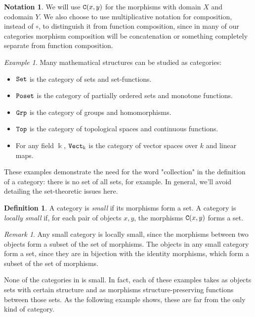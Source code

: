 \documentclass[11 pt]{amsart}
\theoremstyle{plain}   %
\theoremstyle{definition}
\newtheorem{defn}{Definition}[section]
\newtheorem{notn}{Notation}[section]
\theoremstyle{remark}
\newtheorem{rem}{Remark}[section]
\newtheorem{ex}{Example}[section]
\numberwithin{equation}{section}
\newcommand{\cat}[1]{{\normalfont\texttt{#1}}}
\begin{document}
\begin{notn} We will use $\cat{C}(x, y)$ for the morphisms with domain $X$ and
	codomain $Y$. We also choose to use multiplicative notation for composition,
	instead of $\circ$, to distinguish it from function composition, since in many
	of our categories morphism composition will be concatenation or something
	completely separate from function composition. \end{notn}

\begin{ex}\label{concrete categories} Many mathematical structures can be studied as categories:
	\begin{itemize}
		\item $\cat{Set}$ is the category of sets and set-functions.
		\item $\cat{Poset}$ is the category of partially ordered sets and
		      monotone functions.
		\item $\cat{Grp}$ is the category of groups and homomorphisms.
		\item $\cat{Top}$ is the category of topological spaces and continuous
		      functions.
		\item For any field $\Bbbk$, $\cat{Vect}_\Bbbk$ is the category of vector
		      spaces over $k$ and linear maps.
	\end{itemize}
\end{ex}

These examples demonstrate the need for the word "collection" in the
definition of a category: there is no set of all sets, for example. In general,
we'll avoid detailing the set-theoretic issues here.

\begin{defn} A category is \emph{small} if its morphisms
	form a set. A category is \emph{locally small} if, for each pair of objects $x,
		y$, the morphisms $\cat{C}(x, y)$ forms a set. \end{defn}

\begin{rem}
	Any small category is locally small, since the morphisms between two objects
	form a subset of the set of morphisms. The objects in any small category form
	a set, since they are in bijection with the identity morphisms, which form a
	subset of the set of morphisms.
\end{rem}

None of the categories in  is small. In fact, each of
these examples takes as objects sets with certain structure and as morphisms
structure-preserving functions between those sets. As the following example
shows, these are far from the only kind of category.
\end{document}
